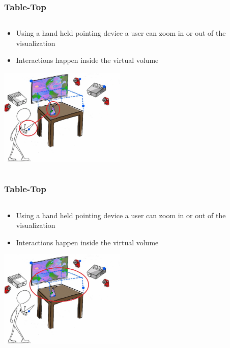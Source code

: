 \documentclass{beamer}
\begin{document}
\begin{frame}
\frametitle{Table-Top} 
	\begin{columns}
    \begin{column}{0.9\textwidth}
    \begin{itemize}
		\item Using a hand held pointing device a user can zoom in or out of the visualization 
		\item Interactions happen inside the virtual volume
	\end{itemize}
	\begin{center}

	\includegraphics[width=6cm]{images/TabletopZoom}
	
	\cite{3D}
	\end{center}
	\end{column}
    \end{columns}
\end{frame}

\begin{frame}
\frametitle{Table-Top} 
	\begin{columns}
    \begin{column}{0.9\textwidth}
    \begin{itemize}
		\item Using a hand held pointing device a user can zoom in or out of the visualization 
		\item Interactions happen inside the virtual volume
	\end{itemize}
	\begin{center}

	\includegraphics[width=6cm]{images/TabletopVV}
	
	\cite{3D}
	\end{center}
	\end{column}
    \end{columns}
\end{frame}
\end{document}
